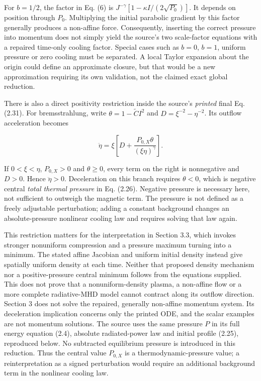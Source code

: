 For \(b=1/2\), the factor in Eq. (6) is
\(J^{-\gamma}[1-\kappa I/(2\sqrt{P_0})]\). It depends on position
through \(P_0\). Multiplying the initial parabolic gradient by this
factor generally produces a non-affine force. Consequently, inserting
the correct pressure into momentum does not simply yield the source's
two scale-factor equations with a repaired time-only cooling factor.
Special cases such as \(b=0\), \(b=1\), uniform pressure or zero cooling
must be separated. A local Taylor expansion about the origin could
define an approximate closure, but that would be a new approximation
requiring its own validation, not the claimed exact global reduction.

There is also a direct positivity restriction inside the source's
\emph{printed} final Eq. (2.31). For bremsstrahlung, write
\(\theta=1-\widetilde C I^2\) and \(D=\xi^{-2}-\eta^{-2}\). Its outflow
acceleration becomes

\[
\ddot\eta=\xi\left[D+\frac{P_{0,X}\theta}{(\xi\eta)^\gamma}\right]. \tag{7}
\]

If \(0<\xi<\eta\), \(P_{0,X}>0\) and \(\theta\ge0\), every term on the
right is nonnegative and \(D>0\). Hence \(\ddot\eta>0\). Deceleration on
this branch requires \(\theta<0\), which is negative central \emph{total
thermal pressure} in Eq. (2.26). Negative pressure is necessary here,
not sufficient to outweigh the magnetic term. The pressure is not
defined as a freely adjustable perturbation; adding a constant
background changes an absolute-pressure nonlinear cooling law and
requires solving that law again.

This restriction matters for the interpretation in Section 3.3, which
invokes stronger nonuniform compression and a pressure maximum turning
into a minimum. The stated affine Jacobian and uniform initial density
instead give spatially uniform density at each time. Neither that
proposed density mechanism nor a positive-pressure central minimum
follows from the equations supplied. This does not prove that a
nonuniform-density plasma, a non-affine flow or a more complete
radiative-MHD model cannot contract along its outflow direction. Section
3 does not solve the repaired, generally non-affine momentum system. Its
deceleration implication concerns only the printed ODE, and the scalar
examples are not momentum solutions. The source uses the same pressure
\(P\) in its full energy equation (2.4), absolute radiated-power law and
initial profile (2.25), reproduced below. No subtracted equilibrium
pressure is introduced in this reduction. Thus the central value
\(P_{0,X}\) is a thermodynamic-pressure value; a reinterpretation as a
signed perturbation would require an additional background term in the
nonlinear cooling law.

